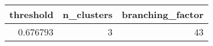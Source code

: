 \begin{tabular}{rrr}
\toprule
threshold & n_clusters & branching_factor \\
\midrule
0.676793 & 3 & 43 \\
\bottomrule
\end{tabular}
